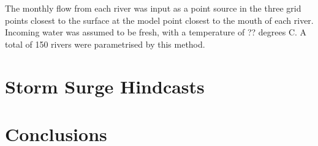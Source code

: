 \documentclass[pdftex,12pt]{article}
\begin{document}
The monthly flow from each river was input as a point source in the three grid points closest to the surface at the model point closest to the mouth of each river. Incoming water was assumed to be fresh, with a temperature of ?? degrees C. A total of 150 rivers were parametrised by this method. 

\section{Storm Surge Hindcasts}\label{sec:storm}

\section{Conclusions}\label{sec:conclusions}




\end{document}
